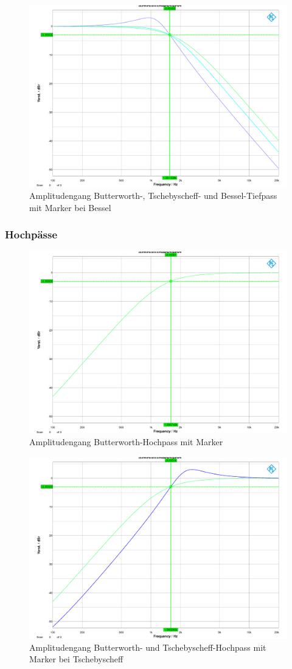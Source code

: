 \begin{figure}[h]
\centering
\includegraphics[width=0.60\linewidth]{Bilder/ImLabor/Amplitudengang_2_3_Bessel_TP_Alle}
\caption{Amplitudengang Butterworth-, Tschebyscheff- und Bessel-Tiefpass mit Marker bei Bessel}
\label{fig:Amplitudengang_2_3_Bessel_TP_Alle}
\end{figure}

\subsubsection{Hochpässe}

\begin{figure}[h]
\centering
\includegraphics[width=0.60\linewidth]{Bilder/ImLabor/Amplitudengang_1_1_Butter_HP}
\caption{Amplitudengang Butterworth-Hochpass mit Marker}
\label{fig:Amplitudengang_1_1_Butter_HP}
\end{figure}

\begin{figure}[h]
\centering
\includegraphics[width=0.60\linewidth]{Bilder/ImLabor/Amplitudengang_1_2_Tscheby_HP}
\caption{Amplitudengang Butterworth- und Tschebyscheff-Hochpass mit Marker bei Tschebyscheff}
\label{fig:Amplitudengang_1_2_Tscheby_HP}
\end{figure}

